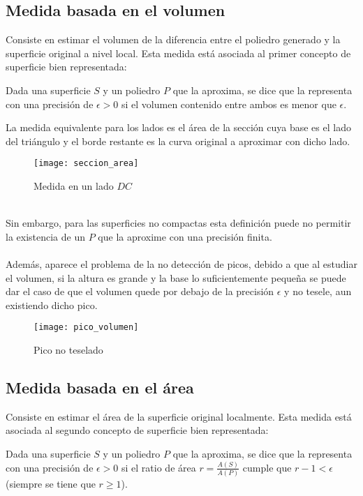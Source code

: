 	\subsection{Medida basada en el volumen}
	
	Consiste en estimar el volumen de la diferencia entre el poliedro generado y la superficie original a nivel local. Esta medida está asociada al primer concepto de superficie bien representada:
	\begin{definicion}
		Dada una superficie $S$ y un poliedro $P$ que la aproxima, se dice que la representa con una precisión de $\epsilon > 0$ si el volumen contenido entre ambos es menor que $\epsilon$.
	\end{definicion}
	La medida equivalente para los lados es el área de la sección cuya base es el lado del triángulo y el borde restante es la curva original a aproximar con dicho lado.\\ 
	\begin{figure}[h]
  		\centering
  		\texttt{[image: seccion\_area]}
  		\caption{Medida en un lado $DC$}
  		\label{fig:seccion_area}
	\end{figure}
	\\ Sin embargo, para las superficies no compactas esta definición puede no permitir la existencia de un $P$ que la aproxime con una precisión finita.\\
	\\ Además, aparece el problema de la no detección de picos, debido a que al estudiar el volumen, si la altura es grande y la base lo suficientemente pequeña se puede dar el caso de que el volumen quede por debajo de la precisión $\epsilon$ y no tesele, aun existiendo dicho pico.
	\newpage
	\begin{figure}[h]
  		\centering
  		\texttt{[image: pico\_volumen]}
  		\caption{Pico no teselado}
  		\label{fig:pico_volumen}
	\end{figure}
	
	\subsection{Medida basada en el área}
	
	Consiste en estimar el área de la superficie original localmente. Esta medida está asociada al segundo concepto de superficie bien representada:
	\begin{definicion}
		Dada una superficie $S$ y un poliedro $P$ que la aproxima, se dice que la representa con una precisión de $\epsilon > 0$ si el ratio de área $r=\frac{A(S)} {A(P)}$ cumple que $r-1 < \epsilon$ (siempre se tiene que $r\geq 1$).
	\end{definicion}
	
